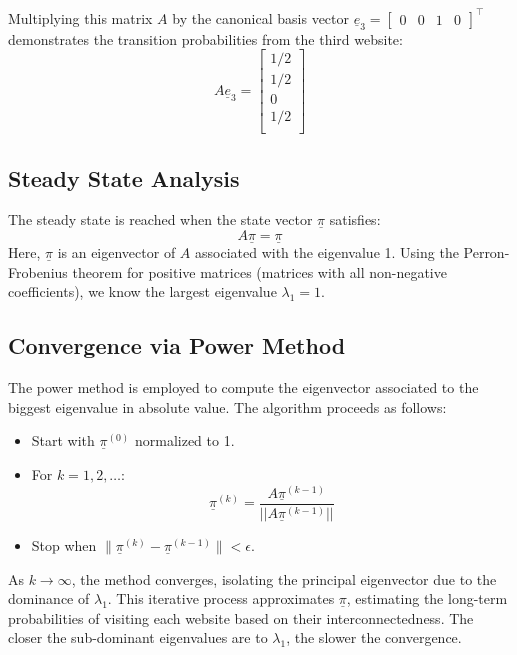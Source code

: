 Multiplying this matrix \(A\) by the canonical basis vector \(\underline{e}_3 = \begin{bmatrix} 0 & 0 & 1 & 0 \end{bmatrix}^\intercal\) demonstrates the transition probabilities from the third website:
\[
    A\underline{e}_3 = \begin{bmatrix}
        1/2\\
        1/2\\
        0\\
        1/2\\
    \end{bmatrix}
\]

\subsection*{Steady State Analysis}
The steady state is reached when the state vector \(\underline{\pi}\) satisfies:
\[
    A\underline{\pi} = \underline{\pi}
\]
Here, \(\underline{\pi}\) is an eigenvector of \(A\) associated with the eigenvalue 1. Using the Perron-Frobenius theorem for positive matrices (matrices with all non-negative coefficients), we know the largest eigenvalue \(\lambda_1 = 1\).

\subsection*{Convergence via Power Method}
The power method is employed to compute the eigenvector associated to the biggest eigenvalue in absolute value. The algorithm proceeds as follows:
\begin{itemize}
    \item Start with \(\underline{\pi}^{(0)}\) normalized to 1.
    \item For \(k = 1, 2, \ldots\):
    \[
        \underline{\pi}^{(k)} = \frac{A\underline{\pi}^{(k-1)}}{||A\underline{\pi}^{(k-1)}||}
    \]
    \item Stop when \(\| \underline{\pi}^{(k)} - \underline{\pi}^{(k-1)} \| < \epsilon\).
\end{itemize}

As \(k \to \infty\), the method converges, isolating the principal eigenvector due to the dominance of \(\lambda_1\). This iterative process approximates \(\underline{\pi}\), estimating the long-term probabilities of visiting each website based on their interconnectedness. The closer the sub-dominant eigenvalues are to \(\lambda_1\), the slower the convergence.

